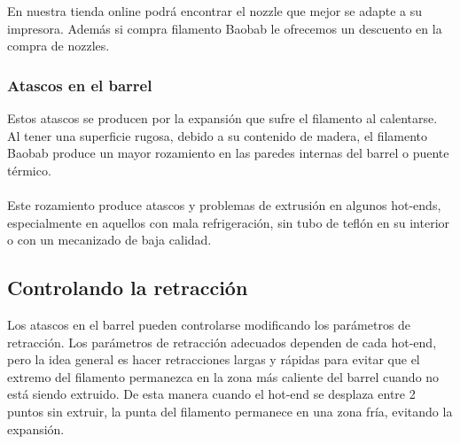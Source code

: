 \documentclass[11pt,a4paper]{article}
\begin{document}
En nuestra tienda online podrá encontrar el nozzle que mejor se adapte a su impresora. Además si compra filamento Baobab le ofrecemos un descuento en la compra de nozzles.		\subsubsection{Atascos en el barrel}
Estos atascos se producen por la expansión que sufre el filamento al calentarse. Al tener una superficie rugosa, debido a su contenido de madera, el filamento Baobab produce un mayor rozamiento en las paredes internas del barrel o puente térmico.\\\\
Este rozamiento produce atascos y problemas de extrusión en algunos hot-ends, especialmente en aquellos con mala refrigeración, sin tubo de teflón en su interior o con un mecanizado de baja calidad.%
	\subsection{Controlando la retracción}
Los atascos en el barrel pueden controlarse modificando los parámetros de retracción. Los parámetros de retracción adecuados dependen de cada hot-end, pero la idea general es hacer retracciones largas y rápidas para evitar que el extremo del filamento permanezca en la zona más caliente del barrel cuando no está siendo extruido. De esta manera cuando el hot-end se desplaza entre 2 puntos sin extruir, la punta del filamento permanece en una zona fría, evitando la expansión.\\\\
	\begin{description}
		\item[]  
		\item[]  
	\end{description}
\end{document}
